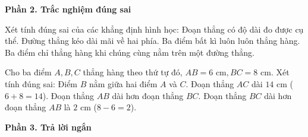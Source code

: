\textbf{Phần 2. Trắc nghiệm đúng sai}

\begin{ex} %
Xét tính đúng sai của các khẳng định hình học:
\choiceTF
{\True Đoạn thẳng có độ dài đo được cụ thể.}
{\True Đường thẳng kéo dài mãi về hai phía.}
{Ba điểm bất kì luôn luôn thẳng hàng.}
{\True Ba điểm chỉ thẳng hàng khi chúng cùng nằm trên một đường thẳng.}
\end{ex}

\begin{ex} %
Cho ba điểm $A, B, C$ thẳng hàng theo thứ tự đó, $AB = 6\text{ cm}, BC = 8\text{ cm}$. Xét tính đúng sai:
\choiceTF
{\True Điểm $B$ nằm giữa hai điểm $A$ và $C$.}
{\True Đoạn thẳng $AC$ dài $14\text{ cm}$ ($6 + 8 = 14$).}
{Đoạn thẳng $AB$ dài hơn đoạn thẳng $BC$.}
{\True Đoạn thẳng $BC$ dài hơn đoạn thẳng $AB$ là $2\text{ cm}$ ($8 - 6 = 2$).}
\end{ex}

\textbf{Phần 3. Trả lời ngắn}

